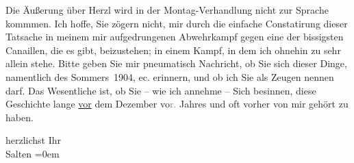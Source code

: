 \pstart
           Die Äußerung über Herzl wird in der Montag-Verhandlung nicht zur Sprache kommmen. Ich hoffe,
               Sie zögern nicht, mir durch die einfache Constatirung dieser Tatsache in meinem \introOben{}mir\introOben{} aufgedrungenen Abwehrkampf gegen eine der bissigsten
               Canaillen, die es gibt, beizustehen; in einem Kampf, in dem ich ohnehin zu sehr
               allein stehe. Bitte geben Sie mir pneumatisch Nachricht, ob Sie sich dieser Dinge,
               namentlich des Sommers 1904, ec. erinnern, und ob ich Sie
               als Zeugen nennen darf. Das Wesentliche ist, ob Sie – wie ich annehme – Sich
               besinnen, diese Geschichte lange \uline{vor} dem Dezember vo\textcolor{gray}{r.} Jahres und oft vorher von
               mir gehört zu haben.\pend
           
\pstart
           herzlichst Ihr {\\[\baselineskip]}\spacefill\mbox{Salten}\pend
           \leftskip=0em{}\endnumbering{}  
      